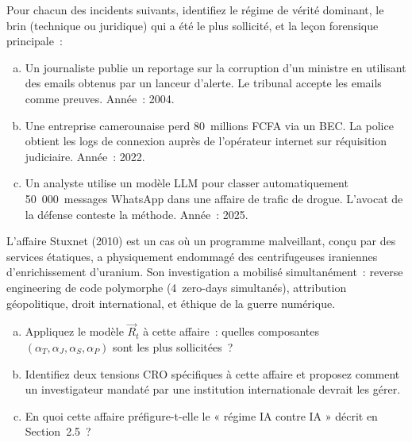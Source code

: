 \begin{boxexo}[title={\ding{45}\quad Exercice~2.1. Analyse d'un incident par son régime \niveaubase}]
Pour chacun des incidents suivants, identifiez le régime de vérité dominant,
le brin (technique ou juridique) qui a été le plus sollicité, et la leçon
forensique principale~:

\begin{enumerate}[(a)]
    \item Un journaliste publie un reportage sur la corruption d'un ministre
          en utilisant des emails obtenus par un lanceur d'alerte. Le tribunal
          accepte les emails comme preuves. Année~: 2004.
    \item Une entreprise camerounaise perd 80~millions FCFA via un BEC. La
          police obtient les logs de connexion auprès de l'opérateur internet
          sur réquisition judiciaire. Année~: 2022.
    \item Un analyste utilise un modèle LLM pour classer automatiquement
          50~000~messages WhatsApp dans une affaire de trafic de drogue.
          L'avocat de la défense conteste la méthode. Année~: 2025.
\end{enumerate}
\end{boxexo}

\begin{boxexo}[title={\ding{45}\quad Exercice~2.2. La double hélice appliquée \niveaumoyen}]
L'affaire Stuxnet (2010) est un cas où un programme malveillant, conçu par
des services étatiques, a physiquement endommagé des centrifugeuses iraniennes
d'enrichissement d'uranium. Son investigation a mobilisé simultanément~:
reverse engineering de code polymorphe (4~zero-days simultanés), attribution
géopolitique, droit international, et éthique de la guerre numérique.

\begin{enumerate}[(a)]
    \item Appliquez le modèle $\vec{R}_t$ à cette affaire~: quelles composantes
          $(\alpha_T, \alpha_J, \alpha_S, \alpha_P)$ sont les plus sollicitées~?
    \item Identifiez deux tensions CRO spécifiques à cette affaire et proposez
          comment un investigateur mandaté par une institution internationale
          devrait les gérer.
    \item En quoi cette affaire préfigure-t-elle le « régime IA contre IA »
          décrit en Section~2.5~?
\end{enumerate}
\end{boxexo}

